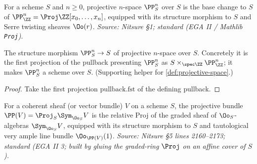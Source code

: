\begin{definition}
  \label{def:projective-space}
  For a scheme $S$ and $n\ge 0$, projective $n$-space $\PP^n_S$ over $S$ is the
  base change to $S$ of $\PP^n_{\ZZ} = \Proj \ZZ[x_0,\dots,x_n]$, equipped with
  its structure morphism to $S$ and Serre twisting sheaves $\Oo(r)$.
  \textit{Source: Nitsure §1; standard (EGA II / Mathlib \texttt{Proj}).}
\end{definition}

\begin{definition}

  \label{def:projective-space-structure-morphism}
  The structure morphism $\PP^n_S \to S$ of projective $n$-space over $S$.
  Concretely it is the first projection of the pullback presenting
  $\PP^n_S$ as $S \times_{\spec\ZZ} \PP^n_{\ZZ}$; it makes $\PP^n_S$ a
  scheme over $S$. (Supporting helper for \ref{def:projective-space}.)
\end{definition}
\begin{proof}
  Take the first projection $\mathrm{pullback.fst}$ of the defining pullback.
\end{proof}

\begin{definition}
  \label{def:relative-proj}
  For a coherent sheaf (or vector bundle) $V$ on a scheme $S$, the projective
  bundle $\PP(V) = \Proj_S \Sym_{\Oo_S} V$ is the relative Proj of the graded
  sheaf of $\Oo_S$-algebras $\Sym_{\Oo_S} V$, equipped with its structure
  morphism to $S$ and tautological very ample line bundle $\Oo_{\PP(V)}(1)$.
  \textit{Source: Nitsure §5 lines 2160--2173; standard (EGA II 3; built by
  gluing the graded-ring $\Proj$ on an affine cover of $S$).}
\end{definition}


